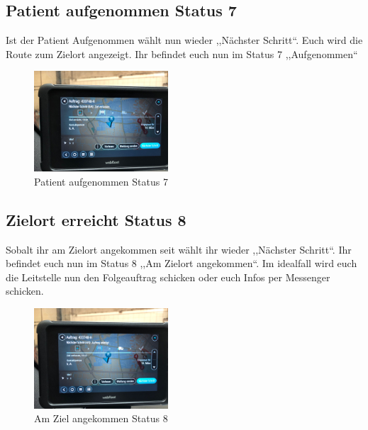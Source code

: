 \documentclass[a4paper,12pt]{scrartcl}
\begin{document}
    \subsection{Patient aufgenommen Status 7}
    Ist der Patient Aufgenommen wählt nun wieder ,,Nächster Schritt``. Euch wird die Route zum Zielort angezeigt.
    Ihr befindet euch nun im Status 7 ,,Aufgenommen``
    \begin{figure}[h]
        \begin{center}
            \includegraphics[width=5cm]{bilder/aufgenommen.jpg}
            \caption{Patient aufgenommen Status 7}
            \label{Patient aufgenommen}
        \end{center} 
    \end{figure}

    \newpage
    \subsection{Zielort erreicht Status 8}
    Sobalt ihr am Zielort angekommen seit wählt ihr wieder ,,Nächster Schritt``. Ihr befindet euch nun im Status 8 ,,Am Zielort angekommen``.
    Im idealfall wird euch die Leitstelle nun den Folgeauftrag schicken oder euch Infos per Messenger schicken.
    \begin{figure}[h]
        \begin{center}
            \includegraphics[width=5cm]{bilder/angekommen.jpg}
            \caption{Am Ziel angekommen Status 8}
            \label{Ziel}
        \end{center} 
    \end{figure}
\end{document}

